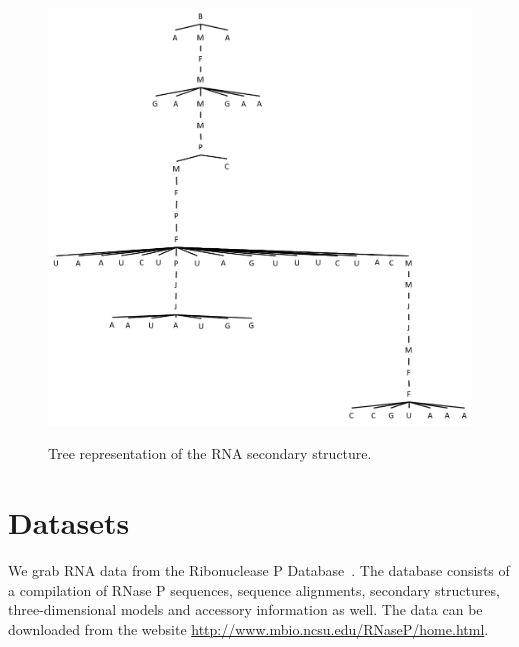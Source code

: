\begin{figure}
		\centering
		\includegraphics[width=16cm,clip]{Figures/RNAST3}
		\label{Tree Representation of the RNA Secondary Structure.} 
		\caption{Tree representation of the RNA secondary structure.}
\end{figure}

\section{Datasets}
We grab RNA data from the Ribonuclease P Database~\cite{brown1998ribonuclease}. The database consists of a compilation of RNase P sequences, sequence alignments, secondary structures,  three-dimensional models and accessory information as well. The data can be downloaded from the website
\url{http://www.mbio.ncsu.edu/RNaseP/home.html}.

